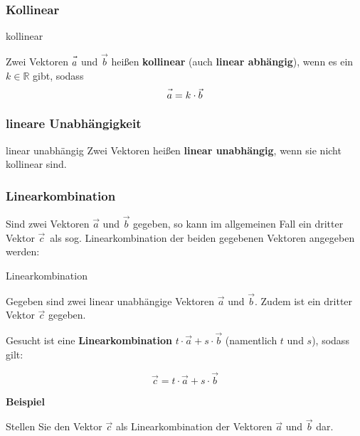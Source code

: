 \subsubsection{Kollinear}

\begin{definition}{kollinear}{}\label{linearkombination}

  Zwei Vektoren $\vec{a\vphantom{b}}$ und $\vec{b}$ heißen
  \textbf{kollinear} (auch \textbf{linear abhängig}), wenn es ein
  $k\in\mathbb{R}$ gibt, sodass
  $$\vec{a\vphantom{b}} = k\cdot{}\vec{b}$$
\end{definition}

\subsubsection{lineare Unabhängigkeit}
\begin{definition}{linear unabhängig}{}
Zwei Vektoren heißen \textbf{linear unabhängig}, wenn sie nicht
kollinear sind.
\end{definition}

\subsubsection{Linearkombination}
Sind zwei Vektoren $\vec{a}$ und $\vec{b}$ gegeben, so kann im
allgemeinen Fall ein
dritter Vektor $\vec{c}$\, als sog. Linearkombination der beiden
gegebenen Vektoren angegeben werden:

\begin{gesetz}{Linearkombination}{}

  Gegeben sind zwei linear unabhängige Vektoren $\vec{a}$ und
  $\vec{b}$. Zudem ist ein dritter Vektor $\vec{c}$ gegeben.

  Gesucht ist eine \textbf{Linearkombination} $t\cdot{}\vec{a} +
  s\cdot{}\vec{b}$ (namentlich $t$ und $s$), sodass gilt:

  $$\vec{c} = t\cdot{}\vec{a} + s\cdot{}\vec{b}$$
\end{gesetz}
\newpage


\textbf{Beispiel}

Stellen Sie den Vektor $\vec{c}$ als Linearkombination der Vektoren
$\vec{a}$ und $\vec{b}$ dar.

